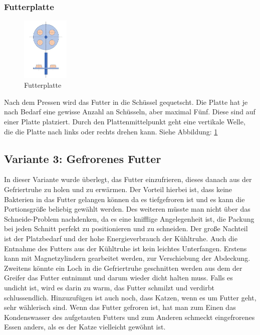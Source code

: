 \subsubsection{Futterplatte}

\begin{figure}
\vspace{-30pt}
  \begin{center}
    \includegraphics[width=0.20\textwidth]{Bilder/Powerpoint/Futterplatte}
  \end{center}
  \caption{Futterplatte}
  \label{Futterplatte}
  \vspace{-20pt}
\end{figure}


Nach dem Pressen wird das Futter in die Schüssel gequetscht. Die Platte hat je nach Bedarf eine gewisse Anzahl an Schüsseln, aber maximal Fünf. Diese sind auf einer Platte platziert. Durch den Plattenmittelpunkt geht eine vertikale Welle, die die Platte nach links oder rechts drehen kann. Siehe Abbildung: \ref{Futterplatte} \\


\subsection{Variante 3: Gefrorenes Futter}

In dieser Variante wurde überlegt, das Futter einzufrieren, dieses danach aus der Gefriertruhe zu holen und zu erwärmen. Der Vorteil hierbei ist, dass keine Bakterien in das Futter gelangen können da es tiefgefroren ist und es kann die Portionsgröße beliebig gewählt werden. Des weiteren müsste man nicht über das Schneide-Problem nachdenken, da es eine knifflige Angelegenheit ist, die Packung bei jeden Schnitt perfekt zu positionieren und zu schneiden. Der große Nachteil ist der Platzbedarf und der hohe Energieverbrauch der Kühltruhe. Auch die Entnahme des Futters aus der Kühltruhe ist kein leichtes Unterfangen. Erstens kann mit Magnetzylindern gearbeitet werden, zur Verschiebung der Abdeckung. Zweitens könnte ein Loch in die Gefriertruhe geschnitten werden aus dem der Greifer das Futter entnimmt und darum wieder dicht halten muss. Falls es undicht ist, wird es darin zu warm, das Futter schmilzt und verdirbt schlussendlich. Hinzuzufügen ist auch noch, dass Katzen, wenn es um Futter geht, sehr wählerisch sind. Wenn das Futter gefroren ist, hat man zum Einen das Kondenswasser des aufgetauten Futters und zum Anderen schmeckt eingefrorenes Essen anders, als es der Katze vielleicht gewöhnt ist.

